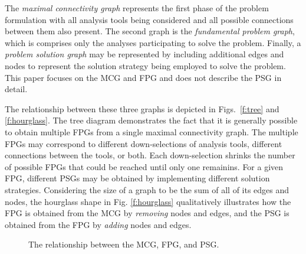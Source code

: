   The \emph{maximal connectivity graph} represents the first phase of the problem formulation with all 
  analysis tools being considered and all possible connections between them also present. The second graph 
  is the \emph{fundamental problem graph}, which is comprises only the analyses participating to solve the problem. Finally, a \emph{problem solution graph} 
  may be represented by including additional edges and nodes to represent the 
  solution strategy being employed to solve the problem. This paper focuses on the MCG and FPG and does not describe the PSG in detail.

  The relationship between these three graphs is depicted in Figs.~\ref{f:tree} and \ref{f:hourglass}. 
  The tree diagram demonstrates the fact that it is generally possible to obtain 
  multiple FPGs from a single maximal connectivity graph. The multiple FPGs may correspond to 
  different down-selections of analysis tools, different connections between the tools, 
  or both. Each down-selection shrinks the number of possible FPGs that could be reached 
  until only one remainins. For a given FPG, different PSGs may be obtained by implementing 
  different solution strategies. Considering the size of a graph to be the sum of all of its
  edges and nodes, the hourglass shape in Fig. \ref{f:hourglass} qualitatively illustrates how
  the FPG is obtained from the MCG by \emph{removing} nodes and edges, 
  and the PSG is obtained from the FPG by \emph{adding} nodes and edges.
  \begin{figure}[htb!]
    \centering
  \caption{The relationship between the MCG, FPG, and PSG.}
  \end{figure}